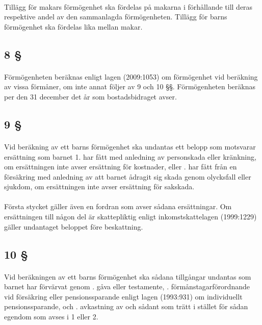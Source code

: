 \documentclass[a4paper,notitlepage,openany,10pt]{book}
\begin{document}
\paragraph*{}
Tillägg för makars förmögenhet ska fördelas på makarna i förhållande till deras respektive andel av den sammanlagda förmögenheten.
Tillägg för barns förmögenhet ska fördelas lika mellan makar.
\subsection*{8 §}
\paragraph*{}
Förmögenheten beräknas enligt lagen (2009:1053) om förmögenhet vid beräkning av vissa förmåner, om inte annat följer av 9 och 10 §§.
Förmögenheten beräknas per den 31 december det år som bostadsbidraget avser.
\subsection*{9 §}
\paragraph*{}
Vid beräkning av ett barns förmögenhet ska undantas ett belopp som motsvarar ersättning som barnet 1. har fått med anledning av personskada eller kränkning, om ersättningen inte avser ersättning för kostnader, eller
. har fått från en försäkring med anledning av att barnet ådragit sig skada genom olycksfall eller sjukdom, om ersättningen inte avser ersättning för sakskada.
\paragraph*{}
Första stycket gäller även en fordran som avser sådana ersättningar. Om ersättningen till någon del är skattepliktig enligt inkomstskattelagen (1999:1229) gäller undantaget beloppet före beskattning.
\subsection*{10 §}
\paragraph*{}
Vid beräkningen av ett barns förmögenhet ska sådana tillgångar undantas som barnet har förvärvat genom
. gåva eller testamente,
. förmånstagarförordnande vid försäkring eller pensionssparande enligt lagen (1993:931) om individuellt pensionssparande, och
. avkastning av och sådant som trätt i stället för sådan egendom som avses i 1 eller 2.
\end{document}
